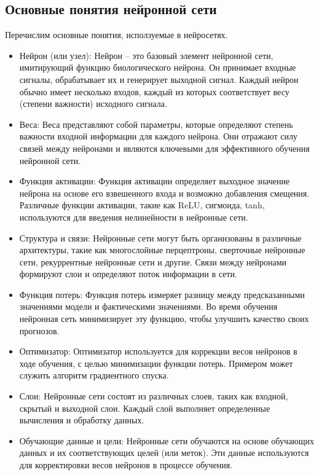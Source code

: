 \documentclass[12pt]{report}
\begin{document}
\subsection{Основные понятия нейронной сети}
Перечислим основные понятия, исползуемые в нейросетях.
\begin{itemize}
    \item Нейрон (или узел): Нейрон -- это базовый элемент нейронной сети, имитирующий функцию биологического нейрона. 
    Он принимает входные сигналы, обрабатывает их и генерирует выходной сигнал. 
    Каждый нейрон обычно имеет несколько входов, каждый из которых соответствует весу (степени важности) исходного сигнала.
    \item Веса: Веса представляют собой параметры, которые определяют степень важности входной информации для каждого нейрона.
    Они отражают силу связей между нейронами и являются ключевыми для эффективного обучения нейронной сети.
    \item Функция активации: Функция активации определяет выходное значение нейрона на основе его взвешенного входа и возможно добавления смещения. 
    Различные функции активации, такие как ReLU, сигмоида, tanh, используются для введения нелинейности в нейронные сети.
    \item Структура и связи:  Нейронные сети могут быть организованы в различные архитектуры, такие как многослойные перцептроны, сверточные нейронные сети, рекуррентные нейронные сети и другие. 
    Связи между нейронами формируют слои и определяют поток информации в сети.
    \item Функция потерь: Функция потерь измеряет разницу между предсказанными значениями модели и фактическими значениями. 
    Во время обучения нейронная сеть минимизирует эту функцию, чтобы улучшить качество своих прогнозов.
    \item Оптимизатор: Оптимизатор используется для коррекции весов нейронов в ходе обучения, с целью минимизации функции потерь.
    Примером может служить алгоритм градиентного спуска.
    \item Слои: Нейронные сети состоят из различных слоев, таких как входной, скрытый и выходной слои. 
    Каждый слой выполняет определенные вычисления и обработку данных.
    \item Обучающие данные и цели: Нейронные сети обучаются на основе обучающих данных и их соответствующих целей (или меток). 
    Эти данные используются для корректировки весов нейронов в процессе обучения.
\end{itemize}
\end{document}
